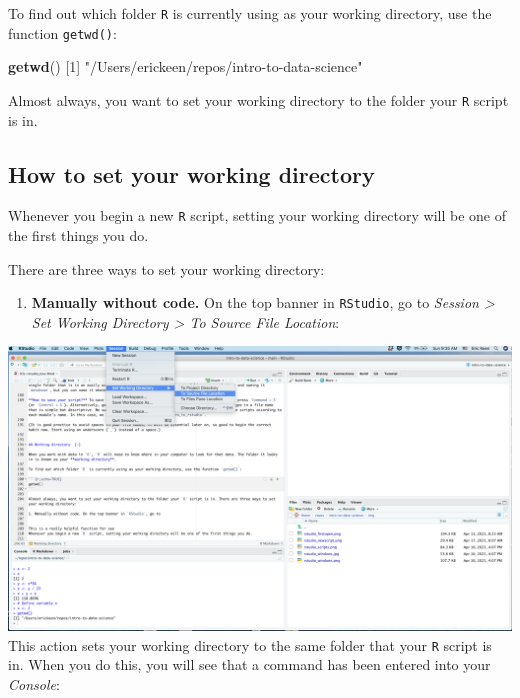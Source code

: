 \documentclass[
]{book}
\newenvironment{Shaded}{\begin{snugshade}}{\end{snugshade}}
\newcommand{\DecValTok}[1]{\textcolor[rgb]{0.00,0.00,0.81}{#1}}
\newcommand{\KeywordTok}[1]{\textcolor[rgb]{0.13,0.29,0.53}{\textbf{#1}}}
\newcommand{\NormalTok}[1]{#1}
\newcommand{\StringTok}[1]{\textcolor[rgb]{0.31,0.60,0.02}{#1}}
\providecommand{\tightlist}{%
  \setlength{\itemsep}{0pt}\setlength{\parskip}{0pt}}
\begin{document}
To find out which folder \texttt{R} is currently using as your working directory, use the function \texttt{getwd()}:

\begin{Shaded}
\begin{Highlighting}[]
\KeywordTok{getwd}\NormalTok{()}
\NormalTok{[}\DecValTok{1}\NormalTok{] }\StringTok{"/Users/erickeen/repos/intro-to-data-science"}
\end{Highlighting}
\end{Shaded}

Almost always, you want to set your working directory to the folder your \texttt{R} script is in.

\hypertarget{how-to-set-your-working-directory}{%
\subsection*{How to set your working directory}\label{how-to-set-your-working-directory}}

Whenever you begin a new \texttt{R} script, setting your working directory will be one of the first things you do.

There are three ways to set your working directory:

\begin{enumerate}
\def\labelenumi{\arabic{enumi}.}
\tightlist
\item
  \textbf{Manually without code.} On the top banner in \texttt{RStudio}, go to \emph{Session \textgreater{} Set Working Directory \textgreater{} To Source File Location}:
\end{enumerate}

\includegraphics{img/rstudio_setwd.png}
This action sets your working directory to the same folder that your \texttt{R} script is in. When you do this, you will see that a command has been entered into your \emph{Console}:
\end{document}
